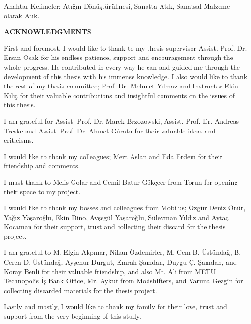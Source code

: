 \documentclass[12pt]{report}
\begin{document}
\noindent Anahtar Kelimeler: Atığın Dönüştürülmesi, Sanatta Atık, Sanatsal Malzeme olarak Atık.
\clearpage


\thispagestyle{plain}
{}
\doublespacing
\begin{center}
	\vspace*{13mm} %
	{\fontsize{14pt}{14pt}\selectfont \textbf{\MakeUppercase{ACKNOWLEDGMENTS}}}\\
    \vspace{3\baselineskip}
\end{center}
\par First and foremost, I would like to thank to my thesis supervisor Assist. Prof. Dr. Ersan Ocak for his endless patience, support and encouragement through the whole progress. He contributed in every way he can and guided me through the development of this thesis with his immense knowledge. I also would like to thank the rest of my thesis committee; Prof. Dr. Mehmet Yılmaz and Instructor Ekin Kılıç for their valuable contributions and insightful comments on the issues of this thesis.

I am grateful for Assist. Prof. Dr. Marek Brzozowski, Assist. Prof. Dr. Andreas Treske and Assist. Prof. Dr. Ahmet Gürata for their valuable ideas and criticisms.

I would like to thank my colleagues; Mert Aslan and Eda Erdem for their friendship and comments. 

I must thank to Melis Golar and Cemil Batur Gökçeer from Torun for opening their space to my project. 

I would like to thank my bosses and colleagues from Mobilus; Özgür Deniz Önür, Yağız Yaşaroğlu, Ekin Dino, Ayşegül Yaşaroğlu, Süleyman Yıldız and Aytaç Kocaman for their support, trust and collecting their discard for the thesis project.

I am grateful to M. Elgin Akpınar, Nihan Özdemirler, M. Cem B. Üstündağ, B. Ceren D. Üstündağ, Ayşenur Durgut, Emrah Şamdan, Duygu Ç. Şamdan, and Koray Benli for their valuable friendship, and also Mr. Ali from METU Technopolis İş Bank Office, Mr. Aykut from Modshifters, and Varuna Gezgin for collecting discarded materials for the thesis project.

Lastly and mostly, I would like to thank my family for their love, trust and support from the very beginning of this study. 
\clearpage
\end{document}
